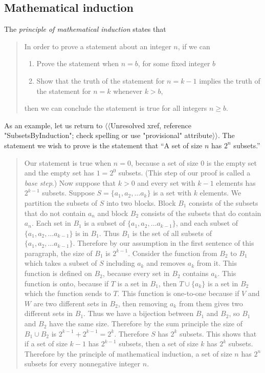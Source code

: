 \documentclass[10pt,]{book}
\theoremstyle{plain}
\theoremstyle{definition}
\numberwithin{equation}{chapter}
\begin{document}
\subsection[{Mathematical induction}]{Mathematical induction}\label{subsection-11}
The \emph{principle of mathematical induction} states that%
\begin{quote}\hypertarget{blockquote-6}{}
In order to prove a statement about an integer \(n\), if we can \leavevmode%
\begin{enumerate}
\item\hypertarget{li-21}{}Prove the statement when \(n=b\), for some fixed integer \(b\)%
\item\hypertarget{li-22}{}Show that the truth of the statement for \(n=k-1\) implies the truth of the statement for \(n=k\) whenever \(k>b\),%
\end{enumerate}
 then we can conclude the statement is true for all integers \(n\ge
b\).\end{quote}
As an example, let us return to {$\langle\langle$Unresolved xref, reference "SubsetsByInduction"; check spelling or use "provisional" attribute$\rangle\rangle$}. The statement we wish to prove is the statement that ``A set of size \(n\) has \(2^n\) subsets.''%
\begin{quote}\hypertarget{blockquote-7}{}
Our statement is true when \(n=0\), because a set of size 0 is the empty set and the empty set has \(1=2^0\) subsets. (This step of our proof is called a \emph{base step}.) Now suppose that \(k>0\) and every set with \(k-1\) elements has \(2^{k-1}\) subsets.  Suppose \(S=\{a_1,a_2,\ldots a_k\}\) is a set with \(k\) elements. We partition the subsets of \(S\) into two blocks.  Block \(B_1\) consists of the subsets that do not contain \(a_n\) and block \(B_2\) consists of the subsets that do contain \(a_n\).  Each set in \(B_1\) is a subset of \(\{a_1,a_2,\ldots a_{k-1}\}\), and each subset of \(\{a_1,a_2, \ldots
a_{k-1}\}\) is in \(B_1\).  Thus \(B_1\) is the set of all subsets of \(\{a_1,a_2,\ldots a_{k-1}\}\).  Therefore by our assumption in the first sentence of this paragraph, the size of \(B_1\) is \(2^{k-1}\).  Consider the function from \(B_2\) to \(B_1\) which takes a subset of \(S\) including \(a_k\) and removes \(a_k\) from it.  This function is defined on \(B_2\), because every set in \(B_2\) contains \(a_k\).  This function is onto, because if \(T\) is a set in \(B_1\), then \(T\cup \{a_k\}\) is a set in \(B_2\) which the function sends to \(T\).  This function is one-to-one because if \(V\) and \(W\) are two different sets in \(B_2\), then removing \(a_k\) from them gives two different sets in \(B_1\).  Thus we have a bijection between \(B_1\) and \(B_2\), so \(B_1\) and \(B_2\) have the same size.  Therefore by the sum principle the size of \(B_1\cup B_2\) is \(2^{k-1} +2^{k-1}=2^k\).  Therefore \(S\) has \(2^k\) subsets.  This shows that if a set of size \(k-1\) has \(2^{k-1}\) subsets, then a set of size \(k\) has \(2^k\) subsets.  Therefore by the principle of mathematical induction, a set of size \(n\) has \(2^n\) subsets for every nonnegative integer \(n\).\end{quote}
\end{document}
